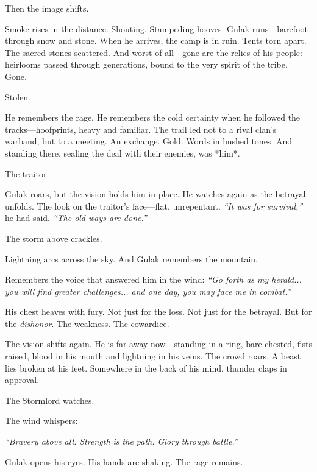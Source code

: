\documentclass[10pt,a4paper,bg=print,twocolumn,openany,nodeprecatedcode]{dndarticle}
\begin{document}
Then the image shifts.

Smoke rises in the distance. Shouting. Stampeding hooves. Gulak runs—barefoot through snow and stone. When he arrives, the camp is in ruin. Tents torn apart. The sacred stones scattered. And worst of all—gone are the relics of his people: heirlooms passed through generations, bound to the very spirit of the tribe. Gone.

Stolen.

He remembers the rage. He remembers the cold certainty when he followed the tracks—hoofprints, heavy and familiar. The trail led not to a rival clan’s warband, but to a meeting. An exchange. Gold. Words in hushed tones. And standing there, sealing the deal with their enemies, was *him*.

The traitor.

Gulak roars, but the vision holds him in place. He watches again as the betrayal unfolds. The look on the traitor’s face—flat, unrepentant. \textit{“It was for survival,”} he had said. \textit{“The old ways are done.”}

The storm above crackles.

Lightning arcs across the sky. And Gulak remembers the mountain.

Remembers the voice that answered him in the wind: \textit{“Go forth as my herald... you will find greater challenges... and one day, you may face me in combat.”}

His chest heaves with fury. Not just for the loss. Not just for the betrayal. But for the \textit{dishonor}. The weakness. The cowardice.

The vision shifts again. He is far away now—standing in a ring, bare-chested, fists raised, blood in his mouth and lightning in his veins. The crowd roars. A beast lies broken at his feet. Somewhere in the back of his mind, thunder claps in approval.

The Stormlord watches.

The wind whispers:

\textit{“Bravery above all. Strength is the path. Glory through battle.”}

Gulak opens his eyes. His hands are shaking. The rage remains.
\end{document}
